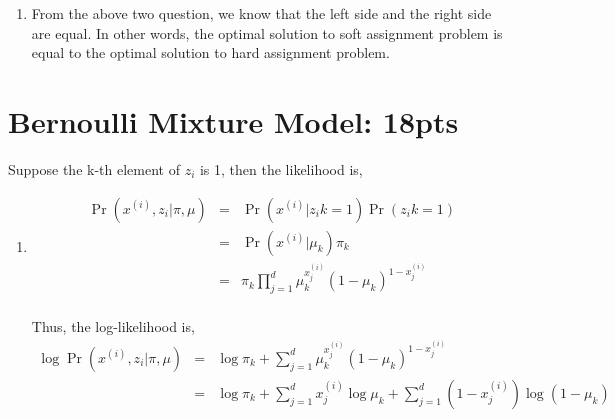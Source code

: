 \documentclass[12pt]{article}
\begin{document}
\begin{enumerate}
    \item From the above two question, we know that the left side and the right side are equal. In other words, the optimal solution to soft assignment problem is equal to the optimal solution to hard assignment problem.
    
\end{enumerate}


\section{Bernoulli Mixture Model: 18pts}
Suppose the k-th element of $z_i$ is 1, then the likelihood is,
\begin{enumerate}
    \item \begin{eqnarray}
        \Pr(x^{(i)}, z_i| \pi, \mu) &=& \Pr(x^{(i)}|z_ik = 1) \Pr(z_ik = 1) \nonumber\\
        &=& \Pr(x^{(i)}|\mu_k) \pi_k \nonumber\\
        &=& \pi_k \prod_{j=1}^d \mu_{k}^{x^{(i)}_j} (1-\mu_k)^{1-x^{(i)}_j} \nonumber \\
    \end{eqnarray}

    Thus, the log-likelihood is,
    \begin{eqnarray}
        \log\Pr(x^{(i)}, z_i| \pi, \mu) &=&  \log \pi_k + \sum_{j=1}^d \mu_{k}^{x^{(i)}_j} (1-\mu_k)^{1-x^{(i)}_j} \nonumber\\
        &=& \log \pi_k + \sum_{j=1}^d x^{(i)}_j \log \mu_k + \sum_{j=1}^d (1-x^{(i)}_j) \log (1-\mu_k) \nonumber
    \end{eqnarray}


\end{enumerate}
\end{document}
